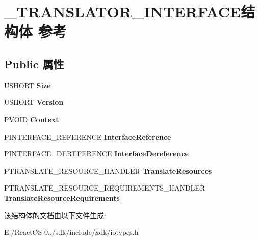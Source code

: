 \hypertarget{struct___t_r_a_n_s_l_a_t_o_r___i_n_t_e_r_f_a_c_e}{}\section{\+\_\+\+T\+R\+A\+N\+S\+L\+A\+T\+O\+R\+\_\+\+I\+N\+T\+E\+R\+F\+A\+C\+E结构体 参考}
\label{struct___t_r_a_n_s_l_a_t_o_r___i_n_t_e_r_f_a_c_e}
\subsection*{Public 属性}
\begin{DoxyCompactItemize}
\item 
\mbox{\label{struct___t_r_a_n_s_l_a_t_o_r___i_n_t_e_r_f_a_c_e_a025970b783c991574e2905b5337a7b58}} 
U\+S\+H\+O\+RT {\bfseries Size}
\item 
\mbox{\label{struct___t_r_a_n_s_l_a_t_o_r___i_n_t_e_r_f_a_c_e_a891e339cc59585d257974ce4e250687e}} 
U\+S\+H\+O\+RT {\bfseries Version}
\item 
\mbox{\label{struct___t_r_a_n_s_l_a_t_o_r___i_n_t_e_r_f_a_c_e_ad6e264f6cc07cf7943f0e65e365fbec2}} 
\hyperlink{interfacevoid}{P\+V\+O\+ID} {\bfseries Context}
\item 
\mbox{\label{struct___t_r_a_n_s_l_a_t_o_r___i_n_t_e_r_f_a_c_e_a11670fd2882aa7a4107a964b884897a1}} 
P\+I\+N\+T\+E\+R\+F\+A\+C\+E\+\_\+\+R\+E\+F\+E\+R\+E\+N\+CE {\bfseries Interface\+Reference}
\item 
\mbox{\label{struct___t_r_a_n_s_l_a_t_o_r___i_n_t_e_r_f_a_c_e_a204bda132ac3dd1be09228bde9adb245}} 
P\+I\+N\+T\+E\+R\+F\+A\+C\+E\+\_\+\+D\+E\+R\+E\+F\+E\+R\+E\+N\+CE {\bfseries Interface\+Dereference}
\item 
\mbox{\label{struct___t_r_a_n_s_l_a_t_o_r___i_n_t_e_r_f_a_c_e_ae48b18a0e68cc0abba4ae0e9ffd7ff93}} 
P\+T\+R\+A\+N\+S\+L\+A\+T\+E\+\_\+\+R\+E\+S\+O\+U\+R\+C\+E\+\_\+\+H\+A\+N\+D\+L\+ER {\bfseries Translate\+Resources}
\item 
\mbox{\label{struct___t_r_a_n_s_l_a_t_o_r___i_n_t_e_r_f_a_c_e_a3015d973f2a4523a766f6909080af9fa}} 
P\+T\+R\+A\+N\+S\+L\+A\+T\+E\+\_\+\+R\+E\+S\+O\+U\+R\+C\+E\+\_\+\+R\+E\+Q\+U\+I\+R\+E\+M\+E\+N\+T\+S\+\_\+\+H\+A\+N\+D\+L\+ER {\bfseries Translate\+Resource\+Requirements}
\end{DoxyCompactItemize}


该结构体的文档由以下文件生成\+:\begin{DoxyCompactItemize}
\item 
E\+:/\+React\+O\+S-\/0../sdk/include/xdk/iotypes.\+h\end{DoxyCompactItemize}
